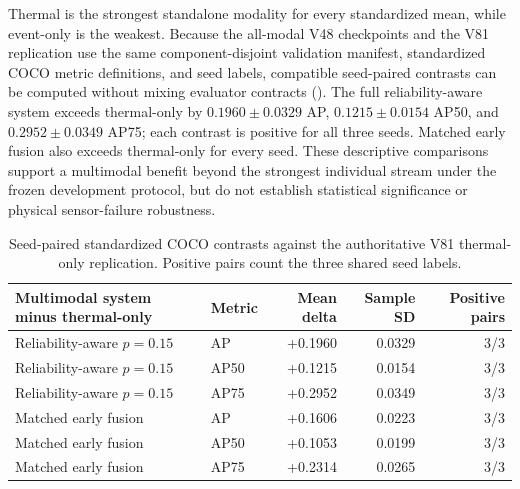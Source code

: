Thermal is the strongest standalone modality for every standardized mean, while event-only is the weakest. Because the all-modal V48 checkpoints and the V81 replication use the same component-disjoint validation manifest, standardized COCO metric definitions, and seed labels, compatible seed-paired contrasts can be computed without mixing evaluator contracts (). The full reliability-aware system exceeds thermal-only by $0.1960\pm0.0329$ AP, $0.1215\pm0.0154$ AP50, and $0.2952\pm0.0349$ AP75; each contrast is positive for all three seeds. Matched early fusion also exceeds thermal-only for every seed. These descriptive comparisons support a multimodal benefit beyond the strongest individual stream under the frozen development protocol, but do not establish statistical significance or physical sensor-failure robustness.

\begin{table}[t]
\centering
\caption{Seed-paired standardized COCO contrasts against the authoritative V81 thermal-only replication. Positive pairs count the three shared seed labels.}
\label{tab:fusion-over-v81-thermal}
\scriptsize
\begin{tabular}{@{}llrrr@{}}
\toprule
Multimodal system minus thermal-only & Metric & Mean delta & Sample SD & Positive pairs\\
\midrule
Reliability-aware $p=0.15$ & AP & +0.1960 & 0.0329 & 3/3\\
Reliability-aware $p=0.15$ & AP50 & +0.1215 & 0.0154 & 3/3\\
Reliability-aware $p=0.15$ & AP75 & +0.2952 & 0.0349 & 3/3\\
Matched early fusion & AP & +0.1606 & 0.0223 & 3/3\\
Matched early fusion & AP50 & +0.1053 & 0.0199 & 3/3\\
Matched early fusion & AP75 & +0.2314 & 0.0265 & 3/3\\
\bottomrule
\end{tabular}
\end{table}

